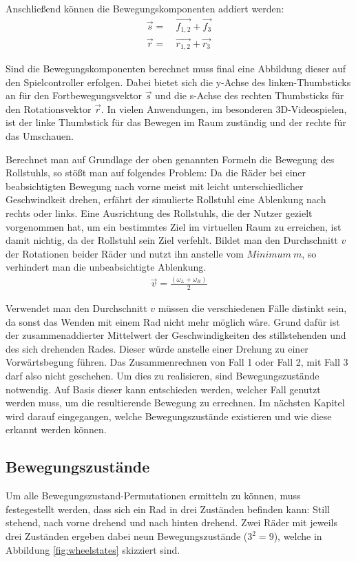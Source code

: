 Anschließend können die Bewegungskomponenten addiert werden:
\begin{align}
    \vec{s} = & \ \vec{f_{1,2}} + \vec{f_3} \\
    \vec{r} = & \ \vec{r_{1,2}} + \vec{r_3}
\end{align}

Sind die Bewegungskomponenten berechnet muss final eine Abbildung dieser auf den Spielcontroller erfolgen.
Dabei bietet sich die y-Achse des linken-Thumbsticks an für den Fortbewegungsvektor $\vec{s}$ und die s-Achse des rechten Thumbsticks für den Rotationsvektor $\vec{r}$.
In vielen Anwendungen, im besonderen 3D-Videospielen, ist der linke Thumbstick für das Bewegen im Raum zuständig und der rechte für das Umschauen.

Berechnet man auf Grundlage der oben genannten Formeln die Bewegung des Rollstuhls, so stößt man auf folgendes Problem:
Da die Räder bei einer beabsichtigten Bewegung nach vorne meist mit leicht unterschiedlicher Geschwindkeit drehen, erfährt der simulierte Rollstuhl eine Ablenkung nach rechts oder links.
Eine Ausrichtung des Rollstuhls, die der Nutzer gezielt vorgenommen hat, um ein bestimmtes Ziel im virtuellen Raum zu erreichen, ist damit nichtig, da der Rollstuhl sein Ziel verfehlt.
Bildet man den Durchschnitt $v$ der Rotationen beider Räder und nutzt ihn anstelle vom $Minimum\ m$, so verhindert man die unbeabsichtigte Ablenkung.
\begin{align}
    \vec{v} = \frac {(\omega_L + \omega_R)} {2}
\end{align}

Verwendet man den Durchschnitt $v$ müssen die verschiedenen Fälle distinkt sein, da sonst das Wenden mit einem Rad nicht mehr möglich wäre.
Grund dafür ist der zusammenaddierter Mittelwert der Geschwindigkeiten des stillstehenden und des sich drehenden Rades.
Dieser würde anstelle einer Drehung zu einer Vorwärtsbegung führen.
Das Zusammenrechnen von Fall 1 oder Fall 2, mit Fall 3 darf also nicht geschehen.
Um dies zu realisieren, sind Bewegungszustände notwendig.
Auf Basis dieser kann entschieden werden, welcher Fall genutzt werden muss, um die resultierende Bewegung zu errechnen.
Im nächsten Kapitel wird darauf eingegangen, welche Bewegungszustände existieren und wie diese erkannt werden können.

\subsection{Bewegungszustände}
Um alle Bewegungszustand-Permutationen ermitteln zu können, muss festegestellt werden, dass sich ein Rad in drei Zuständen befinden kann: Still stehend, nach vorne drehend und nach hinten drehend.
Zwei Räder mit jeweils drei Zuständen ergeben dabei neun Bewegungszustände ($3^2 = 9$), welche in Abbildung \ref{fig:wheelstates} skizziert sind.

